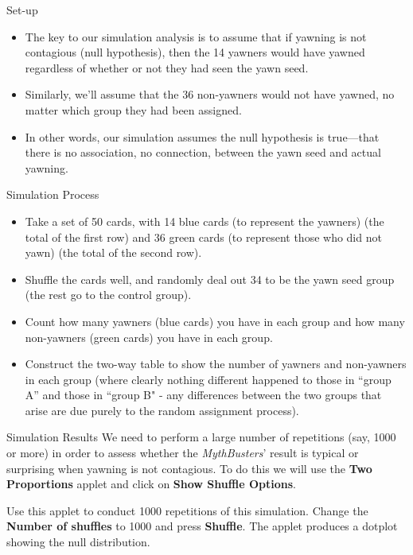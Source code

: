 \documentclass[13pt]{beamer}
\newenvironment{stepitemize}{\begin{itemize}[<+->]}{\end{itemize} }
\begin{document}
\begin{frame}{Set-up}
\begin{stepitemize}
	\item The key to our simulation analysis is to assume that if yawning is not contagious (null hypothesis), then the 14 yawners would have yawned regardless of whether or not they had seen the yawn seed.
	\item Similarly, we'll assume that the 36 non-yawners would not have yawned, no matter which group they had been assigned. 
	\item In other words, our simulation assumes the null hypothesis is true---that there is no association, no connection, between the yawn seed and actual yawning.
\end{stepitemize}

\end{frame}

\begin{frame}{Simulation Process}
\begin{stepitemize}
	\item Take a set of 50 cards, with 14 blue cards (to represent the yawners) (the total of the first row) \pause and 36 green cards (to represent those who did not yawn) (the total of the second row).
	\item Shuffle the cards well, and randomly deal out 34 to be the yawn seed group (the rest go to the control group).
	\item Count how many yawners (blue cards) you have in each group and how many non-yawners (green cards) you have in each group.
	\item Construct the two-way table to show the number of yawners and non-yawners in each group (where clearly nothing different happened to those in ``group A'' and those in ``group B" - any differences between the two groups that arise are due purely to the random assignment process).
\end{stepitemize}
\end{frame}

\begin{frame}{Simulation Results}
We need to perform a large number of repetitions (say, 1000 or more) in order to assess whether the \textit{MythBusters}' result is typical or surprising when yawning is not contagious. To do this we will use the \textbf{Two Proportions} applet and click on \textbf{Show Shuffle Options}. \pause

\vspace*{0.1in}

Use this applet to conduct 1000 repetitions of this simulation. Change the \textbf{Number of shuffles} to 1000 and press \textbf{Shuffle}.  The applet produces a dotplot showing the null distribution.

\end{frame}
\end{document}
